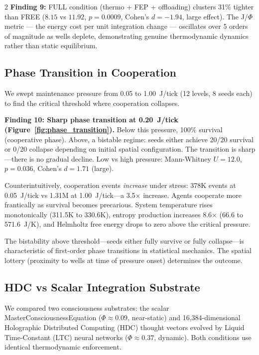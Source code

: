 \documentclass[letterpaper]{article}
\begin{document}
\begin{multicols}{2}
\textbf{Finding 9:} FULL condition (thermo + FEP + offloading) clusters 31\% tighter than FREE ($8.15$ vs $11.92$, $p = 0.0009$, Cohen's $d = -1.94$, large effect). The J/$\Phi$ metric --- the energy cost per unit integration change --- oscillates over 5 orders of magnitude as wells deplete, demonstrating genuine thermodynamic dynamics rather than static equilibrium.

\subsection{Phase Transition in Cooperation}

We swept maintenance pressure from 0.05 to 1.00~J/tick (12 levels, 8 seeds each) to find the critical threshold where cooperation collapses.

\textbf{Finding 10: Sharp phase transition at 0.20~J/tick (Figure~\ref{fig:phase_transition}).} Below this pressure, 100\% survival (cooperative phase). Above, a bistable regime: seeds either achieve 20/20 survival or 0/20 collapse depending on initial spatial configuration. The transition is sharp---there is no gradual decline. Low vs high pressure: Mann-Whitney $U = 12.0$, $p = 0.036$, Cohen's $d = 1.71$ (large).

Counterintuitively, cooperation events \emph{increase} under stress: 378K events at 0.05~J/tick vs 1.31M at 1.00~J/tick---a 3.5$\times$ increase. Agents cooperate more frantically as survival becomes precarious. System temperature rises monotonically (311.5K to 330.6K), entropy production increases 8.6$\times$ (66.6 to 571.6~J/K), and Helmholtz free energy drops to zero above the critical pressure.

The bistability above threshold---seeds either fully survive or fully collapse---is characteristic of first-order phase transitions in statistical mechanics. The spatial lottery (proximity to wells at time of pressure onset) determines the outcome.

\subsection{HDC vs Scalar Integration Substrate}

We compared two consciousness substrates: the scalar MasterConsciousnessEquation ($\Phi \approx 0.09$, near-static) and 16,384-dimensional Holographic Distributed Computing (HDC) thought vectors evolved by Liquid Time-Constant (LTC) neural networks ($\Phi \approx 0.37$, dynamic). Both conditions use identical thermodynamic enforcement.


\end{multicols}
\end{document}
